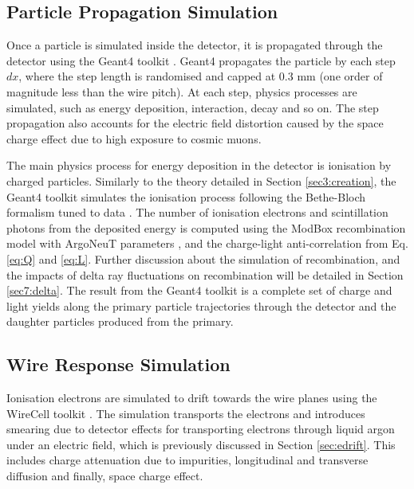 \subsection{Particle Propagation Simulation}
\label{sec:gen_g4}

Once a particle is simulated inside the detector, it is propagated through the detector using the Geant4 toolkit \cite{geant4}.
Geant4 propagates the particle by each step $dx$, where the step length is randomised and capped at 0.3 mm (one order of magnitude less than the wire pitch).
At each step, physics processes are simulated, such as energy deposition, interaction, decay and so on.
The step propagation also accounts for the electric field distortion caused by the space charge effect due to high exposure to cosmic muons.

The main physics process for energy deposition in the detector is ionisation by charged particles.
Similarly to the theory detailed in Section \ref{sec3:creation}, the Geant4 toolkit simulates the ionisation process following the Bethe-Bloch formalism tuned to data \cite{geant4_ions}.
The number of ionisation electrons and scintillation photons from the deposited energy is computed using the ModBox recombination model with ArgoNeuT parameters \cite{argoneut_recomb}, and the charge-light anti-correlation from Eq. \ref{eq:Q} and \ref{eq:L}. 
Further discussion about the simulation of recombination, and the impacts of delta ray fluctuations on recombination will be detailed in Section \ref{sec7:delta}.
The result from the Geant4 toolkit is a complete set of charge and light yields along the primary particle trajectories through the detector and the daughter particles produced from the primary.

\subsection{Wire Response Simulation}
\label{sec:wire_response}

Ionisation electrons are simulated to drift towards the wire planes using the WireCell toolkit \cite{wirecell}.
The simulation transports the electrons and introduces smearing due to detector effects for transporting electrons through liquid argon under an electric field, which is previously discussed in Section \ref{sec:edrift}.
This includes charge attenuation due to impurities, longitudinal and transverse diffusion and finally, space charge effect.

